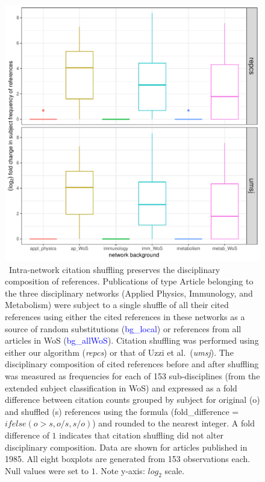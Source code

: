 \documentclass[NETN]{stjour}
\begin{document}
\begin{figure}%
\centering
\includegraphics[width=0.6\linewidth]{background-effect}     
\caption{\ Intra-network citation shuffling preserves the disciplinary composition of references. Publications of type Article belonging to the three disciplinary networks (Applied Physics, Immunology, and  Metabolism) were subject to a single shuffle of all their cited references using either the cited references in these networks as a source of random substitutions (\textcolor{blue}{bg\_local}) or references from all articles in WoS (\textcolor{blue}{bg\_allWoS}). Citation shuffling was performed using either our algorithm (\emph{repcs})
 or that of Uzzi et al.~(\emph{umsj}). The disciplinary composition of cited references before and after shuffling was measured as frequencies for each of 153 sub-disciplines (from the extended subject classification in WoS) and expressed as a fold difference between citation counts grouped by subject for original (o) and shuffled (s) references using the formula (fold\_difference = $ifelse(o > s, o/s, s/o)$) and rounded to the nearest integer. A fold difference of $1$ indicates that citation shuffling did not alter disciplinary composition. Data are shown for articles published in 1985. All eight boxplots are generated from 153 observations each. Null values were set to $1$. Note y-axis: $log_2$ scale.} 
\label{fig:be}
\end{figure}
\end{document}
